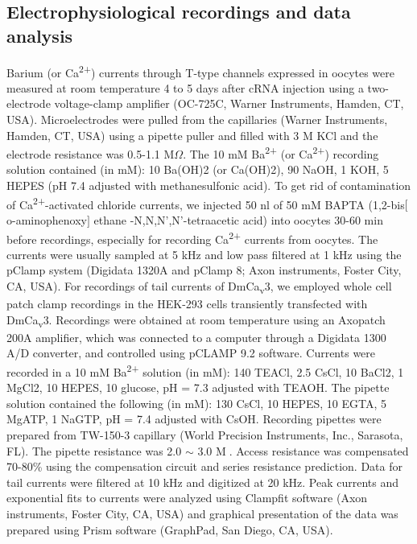 \subsection*{Electrophysiological recordings and data analysis}

Barium (or Ca\textsuperscript{2+}) currents through T-type channels expressed in oocytes were measured at room temperature 4 to 5 days after cRNA injection using a two-electrode voltage-clamp amplifier (OC-725C, Warner Instruments, Hamden, CT, USA).
Microelectrodes were pulled from the capillaries (Warner Instruments, Hamden, CT, USA) using a pipette puller and filled with 3 M KCl and the electrode resistance was 0.5-1.1 M$\Omega$.
The 10 mM Ba\textsuperscript{2+} (or Ca\textsuperscript{2+}) recording solution contained (in mM): 10 Ba(OH)2 (or Ca(OH)2), 90 NaOH, 1 KOH, 5 HEPES (pH 7.4 adjusted with methanesulfonic acid).
To get rid of contamination of Ca\textsuperscript{2+}-activated chloride currents, we injected 50 nl of 50 mM BAPTA (1,2-bis$[$o-aminophenoxy$]$ ethane -N,N,N\textquoteright,N\textquoteright-tetraacetic acid) into oocytes 30-60 min before recordings, especially for recording Ca\textsuperscript{2+} currents from oocytes.
The currents were usually sampled at 5 kHz and low pass filtered at 1 kHz using the pClamp system (Digidata 1320A and pClamp 8; Axon instruments, Foster City, CA, USA). 
For recordings of tail currents of DmCa\textsubscript{v}3, we employed whole cell patch clamp recordings in the HEK-293 cells transiently transfected with DmCa\textsubscript{v}3. 
Recordings were obtained at room temperature using an Axopatch 200A amplifier, which was connected to a computer through a Digidata 1300 A/D converter, and controlled using pCLAMP 9.2 software. 
Currents were recorded in a 10 mM Ba\textsuperscript{2+} solution (in mM): 140 TEACl, 2.5 CsCl, 10 BaCl2, 1 MgCl2, 10 HEPES, 10 glucose, pH = 7.3 adjusted with TEAOH. The pipette solution contained the following (in mM): 130 CsCl, 10 HEPES, 10 EGTA, 5 MgATP, 1 NaGTP, pH = 7.4 adjusted with CsOH. 
Recording pipettes were prepared from TW-150-3 capillary (World Precision Instruments, Inc., Sarasota, FL).
 The pipette resistance was 2.0 $\sim$ 3.0 M. Access resistance was compensated 70-80\%{} using the compensation circuit and series resistance prediction. 
Data for tail currents were filtered at 10 kHz and digitized at 20 kHz. 
Peak currents and exponential fits to currents were analyzed using Clampfit software (Axon instruments, Foster City, CA, USA) and graphical presentation of the data was prepared using Prism software (GraphPad, San Diego, CA, USA). 
